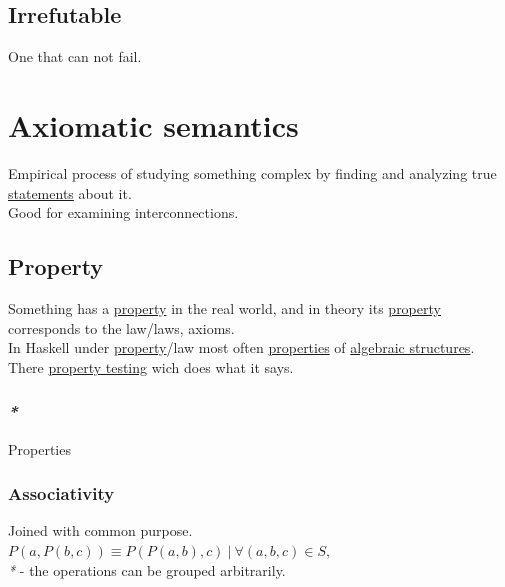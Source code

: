 \documentclass[a4paper,14pt,oneside]{book}
\begin{document}
\subsection{\label{orgbafa008}Irrefutable}
\label{sec:org5c0a8d8}
One that can not fail.\\

\section{\label{orgca1c187}Axiomatic semantics}
\label{sec:org28c204d}
Empirical process of studying something complex by finding and analyzing true \hyperref[org878aa00]{statements} about it.\\

Good for examining interconnections.\\

\subsection{\label{org217f324}Property}
\label{sec:org403ab95}
Something has a \hyperref[org217f324]{property} in the real world, and in theory its \hyperref[org217f324]{property} corresponds to the law/laws, axioms.\\

In Haskell under \hyperref[org217f324]{property}/law most often \hyperref[orge2c24e7]{properties} of \hyperref[orgcc4705a]{algebraic structures}.\\

There \hyperref[orgc0e85fc]{property testing} wich does what it says.\\

\subsubsection{\emph{*}}
\label{sec:org1982ea8}

\label{orge2c24e7}Properties\\

\subsubsection{\label{org90e46c2}Associativity}
\label{sec:org0129db4}
Joined with common purpose.\\

\(P(a,P(b,c)) \equiv P(P(a,b),c) \ | \ \forall (a,b,c) \in S\),\\

\emph{*} - the operations can be grouped arbitrarily.\\
\end{document}

